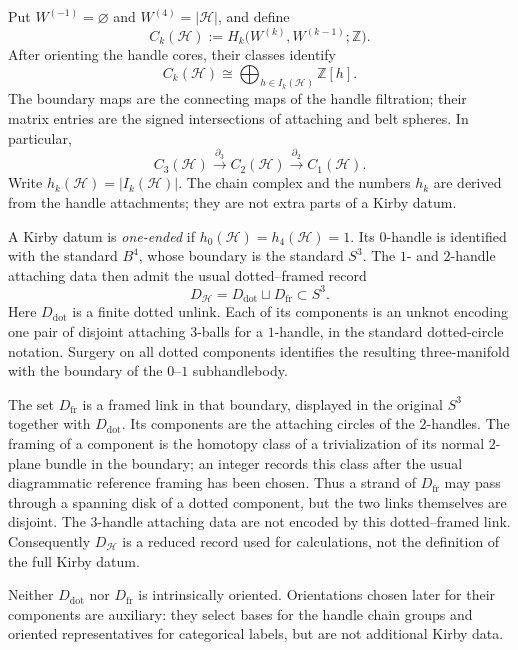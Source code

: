 \begin{definition}
\label{def:derived-handle-chain-complex}
Put \(W^{(-1)}=\varnothing\) and \(W^{(4)}=|\mathcal H|\), and define
\[
  C_k(\mathcal H):=
  H_k\bigl(W^{(k)},W^{(k-1)};\mathbb Z\bigr).
\]
After orienting the handle cores, their classes identify
\[
  C_k(\mathcal H)\cong
  \bigoplus_{h\in I_k(\mathcal H)}\mathbb Z[h].
\]
The boundary maps are the connecting maps of the handle filtration; their
matrix entries are the signed intersections of attaching and belt spheres.
In particular,
\begin{equation}
  C_3(\mathcal H)\xrightarrow{\partial_3}
  C_2(\mathcal H)\xrightarrow{\partial_2}
  C_1(\mathcal H).
  \label{eq:handle-complex}
\end{equation}
Write \(h_k(\mathcal H)=|I_k(\mathcal H)|\).  The chain complex and the
numbers \(h_k\) are derived from the handle attachments; they are not extra
parts of a Kirby datum.
\end{definition}

\begin{definition}
\label{def:one-ended-kirby-datum}
A Kirby datum is \emph{one-ended} if
\(h_0(\mathcal H)=h_4(\mathcal H)=1\).  Its \(0\)-handle is identified with
the standard \(B^4\), whose boundary is the standard \(S^3\).  The \(1\)- and
\(2\)-handle attaching data then admit the usual dotted--framed record
\[
  D_{\mathcal H}=D_{\mathrm{dot}}\sqcup D_{\mathrm{fr}}\subset S^3.
\]
Here \(D_{\mathrm{dot}}\) is a finite dotted unlink.  Each of its components
is an unknot encoding one pair of disjoint attaching \(3\)-balls for a
\(1\)-handle, in the standard dotted-circle notation.  Surgery on all dotted
components identifies the resulting three-manifold with the boundary of the
\(0\)--\(1\) subhandlebody.

The set \(D_{\mathrm{fr}}\) is a framed link in that boundary, displayed in
the original \(S^3\) together with \(D_{\mathrm{dot}}\).  Its components are
the attaching circles of the \(2\)-handles.  The framing of a component is
the homotopy class of a trivialization of its normal \(2\)-plane bundle in
the boundary; an integer records this class after the usual diagrammatic
reference framing has been chosen.  Thus a strand of
\(D_{\mathrm{fr}}\) may pass through a spanning disk of a dotted component,
but the two links themselves are disjoint.  The \(3\)-handle attaching data
are not encoded by this dotted--framed link.  Consequently
\(D_{\mathcal H}\) is a reduced record used for calculations, not the
definition of the full Kirby datum.

Neither \(D_{\mathrm{dot}}\) nor \(D_{\mathrm{fr}}\) is intrinsically
oriented.  Orientations chosen later for their components are auxiliary:
they select bases for the handle chain groups and oriented representatives
for categorical labels, but are not additional Kirby data.
\end{definition}

